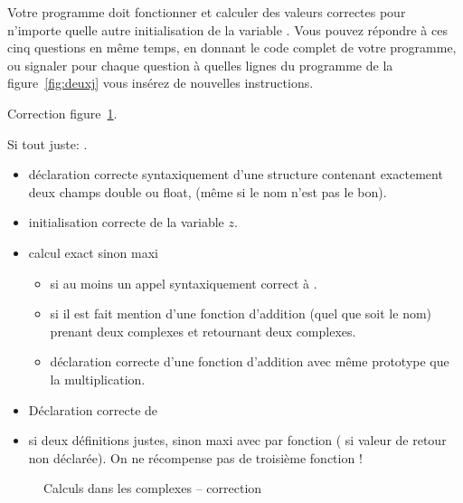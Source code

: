 Votre programme doit fonctionner et calculer des valeurs correctes pour
n'importe quelle autre initialisation de la variable . Vous
pouvez répondre à ces cinq questions en même temps, en donnant le code
complet de votre programme, ou signaler pour chaque question à quelles
lignes du programme de la figure~\ref{fig:deuxj} vous insérez de
nouvelles instructions.

\begin{correction}
  Correction figure~\ref{fig:deuxjcorr}.

  \begin{baremeenv}
Si tout juste: .
    \begin{itemize}
      \item {} déclaration correcte syntaxiquement d'une structure
      contenant exactement deux champs double ou float, (même si le nom
      n'est pas le bon).
      \item {} initialisation correcte de la variable $z$.
      \item {} calcul exact sinon maxi  
        \begin{itemize}
        \item {}  si au moins un appel syntaxiquement correct à
          .
        \item {} si il est fait mention d'une fonction
          d'addition (quel que soit le nom) prenant deux complexes et
          retournant deux complexes.
        \item {}  déclaration correcte d'une fonction d'addition avec
          même prototype que la multiplication.
        \end{itemize}
      \item {}  Déclaration correcte de 
      \item {} si deux définitions justes, sinon maxi 
        avec  par fonction ( si valeur de retour non
        déclarée). On ne récompense pas de troisième
        fonction !
   \end{itemize}
  \end{baremeenv}
\begin{figure}
\begin{small}
\end{small}
\caption{Calculs dans les complexes -- correction}
  \label{fig:deuxjcorr}
\end{figure}
\end{correction}

